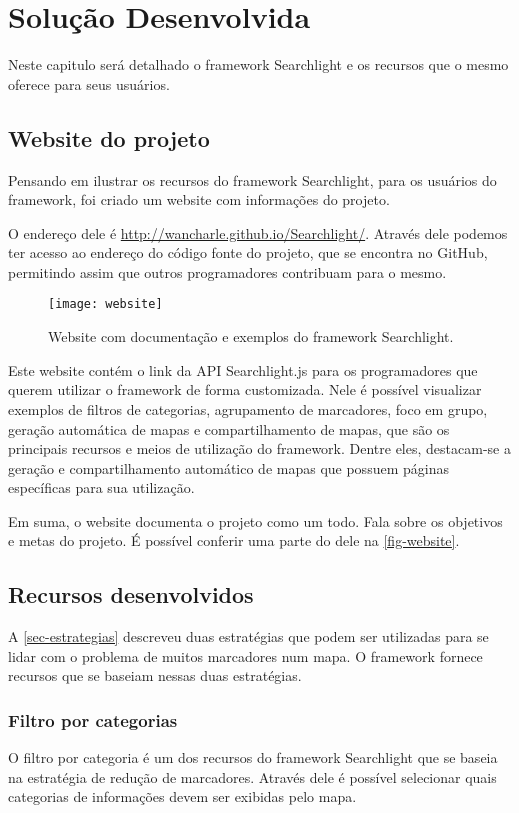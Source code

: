 \chapter{Solução Desenvolvida}

Neste capitulo será detalhado o framework Searchlight e os recursos que o mesmo oferece para seus usuários.

\section{Website do projeto}
Pensando em ilustrar os recursos do framework Searchlight, para os usuários do framework, foi criado um website com informações do projeto.

O endereço dele é \url{http://wancharle.github.io/Searchlight/}. Através dele podemos ter acesso ao endereço do código fonte do projeto, que se encontra no GitHub, permitindo assim que outros programadores contribuam para o mesmo.

\begin{figure}[htb]
	\caption{\label{fig-website}Website com documentação e exemplos do framework Searchlight.}
	\begin{center}
	    \texttt{[image: website]}
	\end{center}
\end{figure}


Este website contém o link da API Searchlight.js para os programadores que querem utilizar o framework de forma customizada. Nele é possível visualizar exemplos de filtros de categorias, agrupamento de marcadores, foco em grupo, geração automática de mapas e compartilhamento de mapas, que são os principais recursos e meios de utilização do framework. Dentre eles, destacam-se a geração e compartilhamento automático de mapas que possuem páginas específicas para sua utilização. 


Em suma, o website documenta o projeto como um todo. Fala sobre os objetivos e metas do projeto. É possível conferir uma parte do dele na \autoref{fig-website}. 

\section{Recursos desenvolvidos}
A \autoref{sec-estrategias} descreveu duas estratégias que podem ser utilizadas para se lidar com o problema de muitos marcadores num mapa. O framework fornece recursos que se baseiam nessas duas estratégias. 

\subsection{Filtro por categorias}
O filtro por categoria é um dos recursos do framework Searchlight que se baseia na estratégia de redução de marcadores. Através dele é possível selecionar quais categorias de informações devem ser exibidas pelo mapa. 

